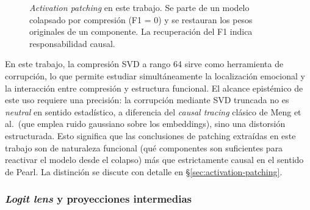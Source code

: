 \begin{figure}[H]
    \centering
    \shorthandoff{><}
    \shorthandon{><}
    \caption{\emph{Activation patching} en este trabajo. Se parte de un modelo colapsado
    por compresión (F1 = 0) y se restauran los pesos originales de un componente.
    La recuperación del F1 indica responsabilidad causal.}
    \label{fig:activation-patching}
\end{figure}

En este trabajo, la compresión SVD a rango 64 sirve como herramienta de
corrupción, lo que permite estudiar simultáneamente la localización emocional y
la interacción entre compresión y estructura funcional. El alcance
epistémico de este uso requiere una precisión: la corrupción mediante SVD
truncada no es
\emph{neutral} en sentido estadístico, a diferencia del \emph{causal tracing}
clásico de Meng et al.\ (que emplea ruido gaussiano sobre los embeddings), sino
una distorsión estructurada. Esto significa que las conclusiones de patching
extraídas en este trabajo son de naturaleza funcional (qué componentes
son suficientes para reactivar el modelo desde el colapso) más que estrictamente
causal en el sentido de Pearl. La distinción se discute con detalle en
\S\ref{sec:activation-patching}.

\subsubsection{\emph{Logit lens} y proyecciones intermedias}
\label{sec:sota-logitlens}

